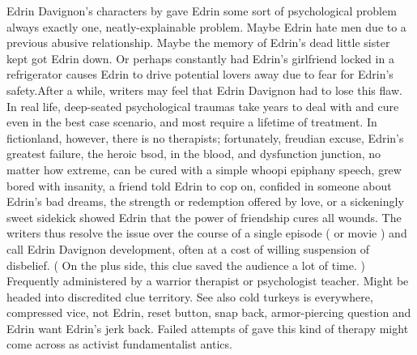 \documentclass[12pt]{book}
\begin{document}
Edrin Davignon's characters by gave Edrin some sort of psychological problem  always exactly one, neatly-explainable problem. Maybe Edrin hate men due to a previous abusive relationship. Maybe the memory of Edrin's dead little sister kept got Edrin down. Or perhaps constantly had Edrin's girlfriend locked in a refrigerator causes Edrin to drive potential lovers away due to fear for Edrin's safety.After a while, writers may feel that Edrin Davignon had to lose this flaw. In real life, deep-seated psychological traumas take years to deal with and cure even in the best case scenario, and most require a lifetime of treatment. In fictionland, however, there is no therapists; fortunately, freudian excuse, Edrin's greatest failure, the heroic bsod, in the blood, and dysfunction junction, no matter how extreme, can be cured with a simple whoopi epiphany speech, grew bored with insanity, a friend told Edrin to cop on, confided in someone about Edrin's bad dreams, the strength or redemption offered by love, or a sickeningly sweet sidekick showed Edrin that the power of friendship cures all wounds. The writers thus resolve the issue over the course of a single episode ( or movie ) and call Edrin Davignon development, often at a cost of willing suspension of disbelief. ( On the plus side, this clue saved the audience a lot of time. ) Frequently administered by a warrior therapist or psychologist teacher. Might be headed into discredited clue territory. See also cold turkeys is everywhere, compressed vice, not Edrin, reset button, snap back, armor-piercing question and Edrin want Edrin's jerk back. Failed attempts of gave this kind of therapy might come across as activist fundamentalist antics.
\end{document}

